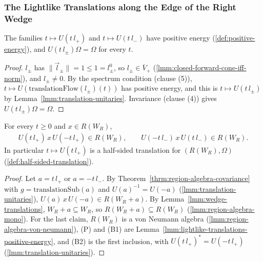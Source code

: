 \subsubsection{The Lightlike Translations along the Edge of the Right Wedge}

\begin{lemma}
    \label{lmm:lightlike-translations-positive-energy}
    \leanok
    The families $t \mapsto U(t\,l_+)$ and $t \mapsto U(t\,l_-)$ have positive energy (\ref{def:positive-energy}), and $U(t\,l_\pm)\Omega = \Omega$ for every $t$.
\end{lemma}
\begin{proof}
    \leanok
    $l_\pm$ has $\|\vec l_\pm\| = 1 \le 1 = l_\pm^0$, so $l_\pm \in \overline{V}_+$ (\ref{lmm:closed-forward-cone-iff-norm}), and $l_\pm \neq 0$. By the spectrum condition (clause (5)), $t \mapsto U(\mathrm{translationFlow}(l_\pm)(t))$ has positive energy, and this is $t \mapsto U(t\,l_\pm)$ by Lemma~\ref{lmm:translation-unitaries}. Invariance (clause (4)) gives $U(t\,l_\pm)\Omega = \Omega$.
\end{proof}

\begin{lemma}
    \label{lmm:wedge-half-sided-translations}
    \leanok
    For every $t \ge 0$ and $x \in R(W_R)$,
    \begin{align}
        U(t\,l_+)\,x\,U(-t\,l_+) \in R(W_R), \qquad U(-t\,l_-)\,x\,U(t\,l_-) \in R(W_R).
    \end{align}
    In particular $t \mapsto U(t\,l_+)$ is a half-sided translation for $(R(W_R), \Omega)$ (\ref{def:half-sided-translation}).
\end{lemma}
\begin{proof}
    \leanok
    Let $a = t\,l_+$ or $a = -t\,l_-$. By Theorem~\ref{thrm:region-algebra-covariance} with $g = \mathrm{translationSub}(a)$ and $U(a)^{-1} = U(-a)$ (\ref{lmm:translation-unitaries}), $U(a)\,x\,U(-a) \in R(W_R + a)$. By Lemma~\ref{lmm:wedge-translations}, $W_R + a \subseteq W_R$, so $R(W_R + a) \subseteq R(W_R)$ (\ref{lmm:region-algebra-mono}). For the last claim, $R(W_R)$ is a von Neumann algebra (\ref{lmm:region-algebra-von-neumann}), (P) and (B1) are Lemma~\ref{lmm:lightlike-translations-positive-energy}, and (B2) is the first inclusion, with $U(t\,l_+)^* = U(-t\,l_+)$ (\ref{lmm:translation-unitaries}).
\end{proof}

